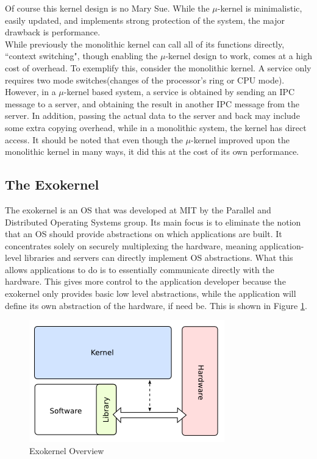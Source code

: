 \documentclass[12pt]{article}
\begin{document}
Of course this kernel design is no Mary Sue. While the $\mu$-kernel is minimalistic, easily updated, and implements strong protection of the system, the major drawback is performance.\\While previously the monolithic kernel can call all of its functions directly, ``context switching", though enabling the $\mu$-kernel design to work, comes at a high cost of overhead. To exemplify this, consider the monolithic kernel. A service only requires two mode switches(changes of the processor's ring or CPU mode). However, in a $\mu$-kernel based system, a service is obtained by sending an IPC message to a server, and obtaining the result in another IPC message from the server. In addition, passing the actual data to the server and back may include some extra copying overhead, while in a monolithic system, the kernel has direct access\cite{wiki:micro}. It should be noted that even though the $\mu$-kernel improved upon the monolithic kernel in many ways, it did this at the cost of its own performance. 
\subsection{The Exokernel}
The exokernel is an OS that was developed at MIT by the Parallel and Distributed Operating Systems group. Its main focus is to eliminate the notion that an OS should provide abstractions on which applications are built. It concentrates solely on securely multiplexing the hardware, meaning application-level libraries and servers can directly implement OS abstractions\cite{MIT}. What this allows applications to do is to essentially communicate directly with the hardware. This gives more control to the application developer because the exokernel only provides basic low level abstractions, while the application will define its own abstraction of the hardware, if need be. This is shown in Figure \ref{fig:exokernel}.

\begin{figure}[h!]
\centering
\includegraphics[width=\linewidth]{pictures/exokernel}
\caption{Exokernel Overview\cite{exo}}
\label{fig:exokernel}
\end{figure}
\end{document}
